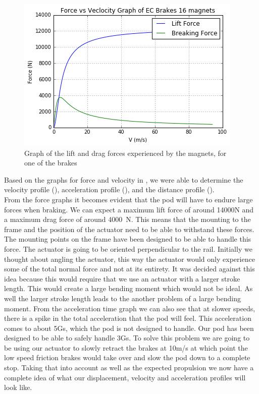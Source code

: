 \documentclass[main.tex]{subfiles}
\begin{document}
    \begin{figure}[H]
        \centering
        \includegraphics[width=\linewidth]{images/force_velocity_graph_16_magnets.png}
        \caption{Graph of the lift and drag forces experienced by the magnets, for one of the brakes}
        \label{fig:force-velocity-graph}
    \end{figure}
    Based on the graphs for force and velocity in , we were able to determine the velocity profile (), acceleration profile (), and the distance profile ().\\
    From the force graphs it becomes evident that the pod will have to endure large forces when braking. We can expect a maximum lift force of around 14000N and a maximum drag force of around \SI{4000}{N}. This means that the mounting to the frame and the position of the actuator need to be able to withstand these forces. The mounting points on the frame have been designed to be able to handle this force. The actuator is going to be oriented perpendicular to the rail. Initially we thought about angling the actuator, this way the actuator would only experience some of the total normal force and not at its entirety. It was decided against this idea because this would require that we use an actuator with a larger stroke length. This would create a large bending moment which would not be ideal. As well the larger stroke length leads to the another problem of a large bending moment.
    From the acceleration time graph we can also see that at slower speeds, there is a spike in the total acceleration that the pod will feel. This acceleration comes to about 5Gs, which the pod is not designed to handle. Our pod has been designed to be able to safely handle 3Gs. To solve this problem we are going to be using our actuator to slowly retract the brakes at 10m/s at which point the low speed friction brakes would take over and slow the pod down to a complete stop. 
   Taking that into account as well as the expected propulsion we now have a complete idea of what our displacement, velocity and acceleration profiles will look like.
   
\end{document}
